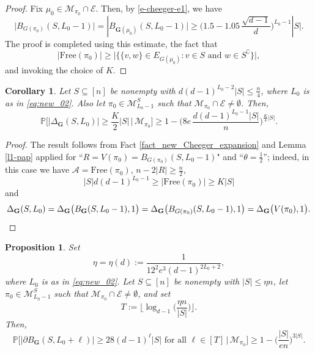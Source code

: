 \documentclass[11pt,leqno]{amsart}
\newtheorem{corollary}[theorem]{Corollary}
\newtheorem{proposition}[theorem]{Proposition}
\theoremstyle{remark}
\theoremstyle{plain}
\begin{document}
\begin{proof}
Fix $\mu_0\in \mathcal{M}_{\pi_0}\cap\mathcal{E}$. Then, by \eqref{e-cheeger-e1}, we have
\[ \big|B_{G(\pi_0)}(S,L_0-1)\big| = |B_{\mathbf{G}(\mu_0)}(S,L_0-1)\big|
\geqslant\Big( 1.5-1.05\,\frac{\sqrt{d-1}}{d} \Big)^{L_0-1} |S|.\]
The proof is completed using this estimate, the fact that
\[ |\mathrm{Free}(\pi_0)|\geqslant \big|\big\{ \{v,w\}\in E_{G(\mu_0)}\colon v\in S \text{ and } w\in S^{\complement}\big\}\big|,\]
and invoking the choice of $K$.
\end{proof}
\begin{corollary}\label{cor_new_base_step}
Let $S\subseteq [n]$ be nonempty with $d(d-1)^{L_0-2}|S|\leqslant\frac{n}{4}$, where $L_0$ is as in \eqref{eq:new_02}.
Also let $\pi_0\in\mathcal{M}^S_{L_0-1}$ such that $\mathcal{M}_{\pi_0}\cap\mathcal{E}\neq\emptyset$. Then,
\[\mathbb{P}\Big[ \big|\Delta_{\mathbf{G}}(S,L_0)\big|\geqslant \frac{K}{2} |S| \, \Big| \, \mathcal{M}_{\pi_0} \Big] \geqslant
1 - \Big(8e\, \frac{d(d-1)^{L_0-1}|S|}{n} \Big)^{\frac{K}{4} |S|}.\]
\end{corollary}
\begin{proof}
The result follows from Fact \ref{fact_new_Cheeger_expansion} and Lemma \ref{l1-pap} applied for
``$R=V(\pi_0)=B_{G(\pi_0)}(S,L_0-1)$" and ``$\theta = \frac{1}{2}$''; indeed,
in this case we have $\mathcal{A}=\mathrm{Free}(\pi_0)$, $n-2|R|\geqslant \frac{n}{2}$,
\[|S|d(d-1)^{L_0-1} \geqslant \big|\mathrm{Free}(\pi_0)\big|\geqslant K|S|\]
and%
\[\Delta_{\mathbf{G}}(S,L_0) = \Delta_{\mathbf{G}}\big( B_{\mathbf{G}}(S,L_0-1), 1\big)=
\Delta_{\mathbf{G}}\big( B_{G(\pi_0)}(S,L_0-1), 1\big)=\Delta_{\mathbf{G}} \big(V(\pi_0),1\big). \qedhere \]
\end{proof}
\begin{proposition} \label{p3-pap1}
Set
\begin{equation} \label{e-pap1-p1}
\eta=\eta(d):= \frac{1}{12^{2} e^{3} (d-1)^{2L_0+2}},
\end{equation}
where $L_0$ is as in \eqref{eq:new_02}.
Let $S\subseteq [n]$ be nonempty with $|S|\leqslant \eta n$,
let $\pi_0\in\mathcal{M}^S_{L_0-1}$ such that $\mathcal{M}_{\pi_0}\cap\mathcal{E}\neq\emptyset$, and set
\begin{equation} \label{e-pap-p2}
T:= \Big\lfloor \log_{d-1}\Big(\frac{\eta n}{|S|}\Big)\Big\rfloor.
\end{equation}
Then,
\begin{equation} \label{eqkt22}
\mathbb{P} \Big[ \big|\partial B_{\mathbf{G}}(S,L_0+\ell)\big| \geqslant
28  (d-1)^\ell |S| \text{ for all } \ell\in [T]  \, \Big| \, \mathcal{M}_{\pi_0} \Big]
 \geqslant 1- \Big(\frac{|S|}{en}\Big)^{3|S|}.
\end{equation}
\end{proposition}
\end{document}
